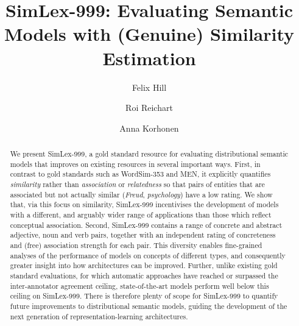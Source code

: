 \documentclass[fullname]{clv2}
\begin{document}
\title{SimLex-999: Evaluating Semantic Models with (Genuine) Similarity Estimation}

\author{Felix Hill}


\author{Roi Reichart}




\author{Anna Korhonen}

\maketitle

\begin{abstract}
We present SimLex-999, a gold standard resource for evaluating distributional semantic models that improves on existing resources in several important ways. First, in contrast to gold standards such as WordSim-353 and MEN, it explicitly quantifies \emph{similarity} rather than \emph{association} or \emph{relatedness} so that pairs of entities that are associated but not actually similar (\emph{Freud}, \emph{psychology}) have a low rating. We show that, via this focus on similarity, SimLex-999 incentivises the development of models with a different, and arguably wider range of applications than those which reflect conceptual association. Second, SimLex-999 contains a range of concrete and abstract adjective, noun and verb pairs, together with an independent rating of concreteness and (free) association strength for each pair. This diversity enables fine-grained analyses of the performance of models on concepts of different types, and consequently greater insight into how architectures can be improved. Further, unlike existing gold standard evaluations, for which automatic approaches have reached or surpassed the inter-annotator agreement ceiling, state-of-the-art models perform well below this ceiling on SimLex-999. There is therefore plenty of scope for SimLex-999 to quantify future improvements to distributional semantic models, guiding the development of the next generation of representation-learning architectures.      
\end{abstract}
\end{document}
